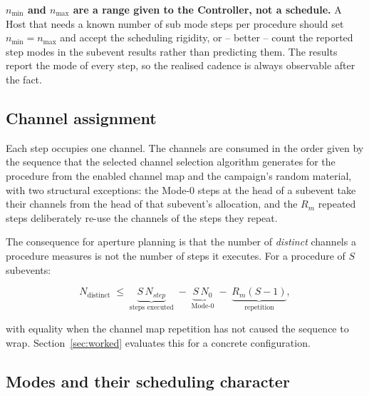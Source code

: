 \documentclass[11pt,a4paper]{article}
\newcommand{\Nst}{N_{step}}
\begin{document}
\begin{callout}
\textbf{$n_{\min}$ and $n_{\max}$ are a range given to the Controller, not a schedule.} A Host that
needs a known number of sub mode steps per procedure should set $n_{\min} = n_{\max}$ and accept the
scheduling rigidity, or -- better -- count the reported step modes in the subevent results rather
than predicting them. The results report the mode of every step, so the realised cadence is always
observable after the fact.
\end{callout}

\subsection{Channel assignment}

Each step occupies one channel. The channels are consumed in the order given by the sequence that the
selected channel selection algorithm generates for the procedure from the enabled channel map and the
campaign's random material, with two structural exceptions: the Mode-0 steps at the head of a
subevent take their channels from the head of that subevent's allocation, and the $R_m$ repeated
steps deliberately re-use the channels of the steps they repeat.

The consequence for aperture planning is that the number of \emph{distinct} channels a procedure
measures is not the number of steps it executes. For a procedure of $S$ subevents:

\begin{equation}
N_{\text{distinct}} \;\le\; \underbrace{S\,\Nst}_{\text{steps executed}}
   \;-\; \underbrace{S\,N_0}_{\text{Mode-0}}
   \;-\; \underbrace{R_m (S-1)}_{\text{repetition}},
\label{eq:distinct}
\end{equation}

with equality when the channel map repetition has not caused the sequence to wrap. Section~\ref{sec:worked}
evaluates this for a concrete configuration.

\subsection{Modes and their scheduling character}
\end{document}
